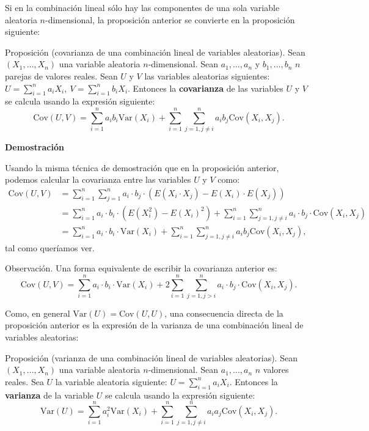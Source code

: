 \documentclass[]{book}
\begin{document}
Si en la combinación lineal sólo hay las componentes de una sola variable aleatoria \(n\)-dimensional, la proposición anterior se convierte en la proposición siguiente:

Proposición (covarianza de una combinación lineal de variables aleatorias).
Sean \((X_1,\ldots,X_n)\) una variable aleatoria \(n\)-dimensional. Sean \(a_1, \ldots, a_n\) y \(b_1,\ldots, b_n\) \(n\) parejas de valores reales. Sean \(U\) y \(V\) las variables aleatorias siguientes:
\(U=\sum\limits_{i=1}^n a_i X_i,\  V=\sum\limits_{i=1}^n b_i X_i.\)
Entonces la \textbf{covarianza} de las variables \(U\) y \(V\) se calcula usando la expresión siguiente:
\[
\mathrm{Cov}(U,V)=\sum_{i=1}^n a_i b_i \mathrm{Var}(X_i)+\sum_{i=1}^n\sum_{j=1,j\neq i}^n a_i b_j \mathrm{Cov}(X_i,X_j).
\]

\textbf{Demostración}

Usando la misma técnica de demostración que en la proposición anterior, podemos calcular la covarianza entre las variables \(U\) y \(V\) como:
\[
\begin{array}{rl}
\mathrm{Cov}(U,V) & = \sum\limits_{i=1}^n \sum\limits_{j=1}^n a_i\cdot  b_j\cdot  \left(E\left(X_i \cdot X_j\right) - E(X_i)\cdot  E(X_j)\right) \\
&= \sum\limits_{i=1}^n a_i\cdot  b_i \cdot \left(E\left(X_i^2\right) - E(X_i)^2\right)+\sum\limits_{i=1}^n \sum\limits_{j=1,j\neq i}^n a_i \cdot b_j\cdot  \mathrm{Cov}(X_i,X_j) \\ & = \sum\limits_{i=1}^n a_i\cdot  b_i\cdot  \mathrm{Var}(X_i)+\sum\limits_{i=1}^n \sum\limits_{j=1,j\neq i}^n a_i b_j \mathrm{Cov}(X_i,X_j),
\end{array}
\]
tal como queríamos ver.

Observación.
Una forma equivalente de escribir la covarianza anterior es:
\[
\mathrm{Cov}(U,V)=\sum_{i=1}^n a_i\cdot  b_i\cdot  \mathrm{Var}(X_i)+2\sum_{i=1}^n\sum_{j=1,j>i}^n a_i\cdot  b_j\cdot  \mathrm{Cov}(X_i,X_j).
\]

Como, en general \(\mathrm{Var}(U)=\mathrm{Cov}(U,U)\), una consecuencia directa de la proposición anterior es la expresión de la varianza de una combinación lineal de variables aleatorias:

Proposición (varianza de una combinación lineal de variables aleatorias).
Sean \((X_1,\ldots,X_n)\) una variable aleatoria \(n\)-dimensional. Sean \(a_1, \ldots, a_n\) \(n\) valores reales. Sea \(U\) la variable aleatoria siguiente:
\(U=\sum\limits_{i=1}^n a_i X_i.\)
Entonces la \textbf{varianza} de la variable \(U\) se calcula usando la expresión siguiente:
\[
\mathrm{Var}(U)=\sum_{i=1}^n a_i^2 \mathrm{Var}(X_i)+\sum_{i=1}^n\sum_{j=1,j\neq i}^n a_i a_j \mathrm{Cov}(X_i,X_j).
\]
\end{document}
